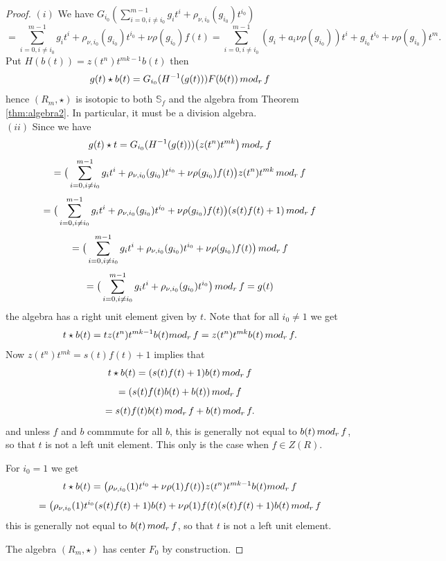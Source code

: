\documentclass[10pt,a4paper]{amsart}
\begin{document}
\begin{proof}
$(i)$ We have
$G_{i_0}(\sum_{i=0,i\not=i_0}^{m-1} g_it^i +\rho_{\nu,i_0}(g_{i_0})t^{i_0})$
$$=\sum_{i=0,i\not=i_0}^{m-1} g_it^i +\rho_{\nu,i_0}(g_{i_0})t^{i_0}+\nu\rho(g_{i_0})f(t)=
\sum_{i=0,i\not=i_0}^{m-1} (g_i +a_i \nu \rho(g_{i_0})  )t^i +   g_{i_0}t^{i_0}+ \nu\rho(g_{i_0})t^m.$$
 Put $H(b(t))= z(t^n)t^{mk-1}b(t)$ then
 $$g(t) \star b(t)=G_{i_0}(H^{-1}(g(t))) F(b(t)) \, {\rm mod}_r\, f$$
 hence $(R_m,\star)$ is isotopic to both $\mathbb{S}_f$ and the algebra from  Theorem  \ref{thm:algebra2}. In particular, it must be a division algebra.
 \\ $(ii)$ Since  we have
 $$g(t) \star t=G_{i_0}(H^{-1}(g(t))) \big( z(t^n)t^{mk}\big) \, {\rm mod}_r\, f$$
$$=\big(\sum_{i=0,i\not=i_0}^{m-1} g_it^i +\rho_{\nu,i_0}(g_{i_0})t^{i_0} + \nu\rho(g_{i_0})f(t)\big) z(t^n)t^{mk} \, {\rm mod}_r\,f$$
$$=\big(\sum_{i=0,i\not=i_0}^{m-1} g_it^i +\rho_{\nu,i_0}(g_{i_0})t^{i_0} + \nu\rho(g_{i_0})f(t)\big)  (s(t)f(t)+1) \, {\rm mod}_r\,f$$
$$=\big(\sum_{i=0,i\not=i_0}^{m-1} g_it^i +\rho_{\nu,i_0}(g_{i_0})t^{i_0} + \nu\rho(g_{i_0})f(t)\big)   \, {\rm mod}_r\,f$$
$$=\big(\sum_{i=0,i\not=i_0}^{m-1} g_it^i +\rho_{\nu,i_0}(g_{i_0})t^{i_0}\big)   \, {\rm mod}_r\,f=g(t)$$
the algebra has a right unit element given by $t$.
Note that for all $i_0\not=1$ we  get
$$ t \star b(t)
=t   z(t^n)t^{mk-1} b(t) {\rm mod}_r\,f=  z(t^n)t^{mk} b(t)\, {\rm mod}_r\,f.$$
Now $ z(t^n)t^{mk}=s(t)f(t)+1$ implies that
$$ t \star b(t)=  (s(t)f(t)+1) b(t) \, {\rm mod}_r\,f$$
$$= (s(t)f(t) b(t) +b(t))\, {\rm mod}_r\,f$$
$$= s(t)f(t) b(t)\, {\rm mod}_r\,f +   b(t)\, {\rm mod}_r\,f.$$
and unless $f$ and $b$ commmute for all $b$, this is generally not equal to $ b(t) \,{\rm mod}_r\,f$, so that $t$ is not a left unit element.
This only is the case when $f\in Z(R)$.

For $i_0=1$ we  get
$$ t \star b(t)
=\big(\rho_{\nu,i_0}(1)t^{i_0} + \nu\rho(1)f(t)\big)  z(t^n)t^{mk-1} b(t) {\rm mod}_r\,f$$
$$= \big(\rho_{\nu,i_0}(1)t^{i_0} (s(t)f(t)+1)  b(t)
+ \nu\rho(1)f(t)  (s(t)f(t)+1)  b(t) \, {\rm mod}_r\,f$$
this is generally not equal to $ b(t) \,{\rm mod}_r\,f$, so that $t$ is not a left unit element.

The algebra $(R_m,\star)$ has center $F_0$ by construction.
\end{proof}
\end{document}
